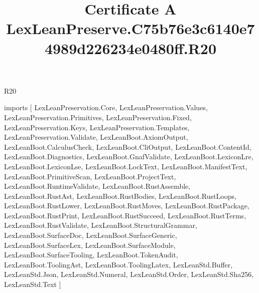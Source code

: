\begin{lexlean}{R20}
\title{Certificate A LexLeanPreserve.C75b76e3c6140e74989d226234e0480ff.R20}
\begin{coremodule}
imports [
  LexLeanPreservation.Core,
  LexLeanPreservation.Values,
  LexLeanPreservation.Primitives,
  LexLeanPreservation.Fixed,
  LexLeanPreservation.Keys,
  LexLeanPreservation.Templates,
  LexLeanPreservation.Validate,
  LexLeanBoot.AxiomOutput,
  LexLeanBoot.CalculusCheck,
  LexLeanBoot.CliOutput,
  LexLeanBoot.ContentId,
  LexLeanBoot.Diagnostics,
  LexLeanBoot.GnafValidate,
  LexLeanBoot.LexiconLre,
  LexLeanBoot.LexiconLse,
  LexLeanBoot.LockText,
  LexLeanBoot.ManifestText,
  LexLeanBoot.PrimitiveScan,
  LexLeanBoot.ProjectText,
  LexLeanBoot.RuntimeValidate,
  LexLeanBoot.RustAssemble,
  LexLeanBoot.RustAst,
  LexLeanBoot.RustBodies,
  LexLeanBoot.RustLoops,
  LexLeanBoot.RustLower,
  LexLeanBoot.RustMoves,
  LexLeanBoot.RustPackage,
  LexLeanBoot.RustPrint,
  LexLeanBoot.RustSucceed,
  LexLeanBoot.RustTerms,
  LexLeanBoot.RustValidate,
  LexLeanBoot.StructuralGrammar,
  LexLeanBoot.SurfaceDoc,
  LexLeanBoot.SurfaceGeneric,
  LexLeanBoot.SurfaceLex,
  LexLeanBoot.SurfaceModule,
  LexLeanBoot.SurfaceTooling,
  LexLeanBoot.TokenAudit,
  LexLeanBoot.ToolingAst,
  LexLeanBoot.ToolingLatex,
  LexLeanStd.Buffer,
  LexLeanStd.Json,
  LexLeanStd.Numeral,
  LexLeanStd.Order,
  LexLeanStd.Sha256,
  LexLeanStd.Text
]


\end{coremodule}
\end{lexlean}
